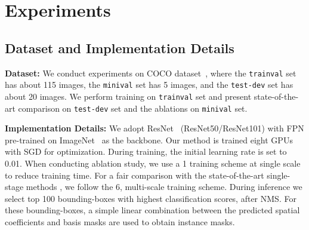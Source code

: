 \documentclass[runningheads]{llncs}
\begin{document}
\section{Experiments}
\subsection{Dataset and Implementation Details}
\noindent \textbf{Dataset:} We conduct experiments on COCO dataset~\cite{Lin_COCO_ECCV_2014}, where the \texttt{trainval} set has about 115 images, the \texttt{minival} set has 5 images, and the \texttt{test-dev} set has about 20 images. We perform training on \texttt{trainval} set and  present  state-of-the-art comparison on \texttt{test-dev} set and the ablations on \texttt{minival} set.

\noindent \textbf{Implementation Details:} We adopt ResNet~\cite{He_ResNet_CVPR_2016} (ResNet50/ResNet101) with FPN pre-trained on ImageNet~\cite{Russakovsky_ImageNet_IJCV_2015} as the backbone. Our method is trained eight GPUs with SGD for optimization. During training, the initial learning rate is set to 0.01. When conducting ablation study, we use 
a 1 training scheme at single scale to reduce training time.   For a fair comparison with the  state-of-the-art single-stage  methods \cite{Chen_TensorMask_ICCV_2019,Bolya_YOLACT_ICCV_2019}, we follow  the 6, multi-scale  training scheme. During inference  we select  top 100 bounding-boxes  with highest  classification scores, after NMS. 
For these bounding-boxes, a simple linear combination between the predicted spatial coefficients and  basis masks are used  to obtain instance  masks.
\end{document}
